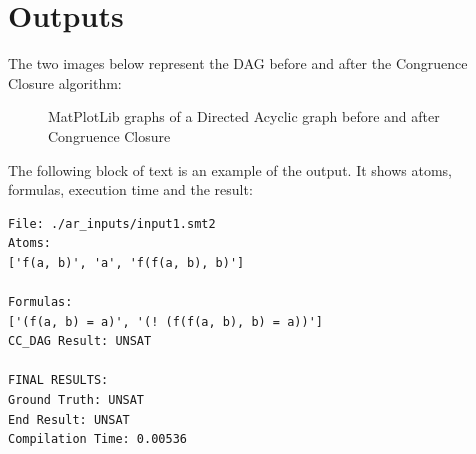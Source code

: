 \documentclass[a4paper]{article}
\begin{document}
\section{Outputs}
The two images below represent the DAG before and after the Congruence Closure algorithm:
\begin{figure}[]
    \begin{adjustbox}{max width=1.2\linewidth,center}
    

    \end{adjustbox}
    \label{fig:DAG}
    \caption{MatPlotLib graphs of a Directed Acyclic graph before and after Congruence Closure}
\end{figure}
\newpage
\noindent
The following block of text is an example of the output. It shows atoms, formulas, execution time and the result:
\begin{lstlisting}[caption=Result example]
File: ./ar_inputs/input1.smt2
Atoms:
['f(a, b)', 'a', 'f(f(a, b), b)']

Formulas:
['(f(a, b) = a)', '(! (f(f(a, b), b) = a))']
CC_DAG Result: UNSAT

FINAL RESULTS:
Ground Truth: UNSAT
End Result: UNSAT
Compilation Time: 0.00536
\end{lstlisting}
\end{document}
